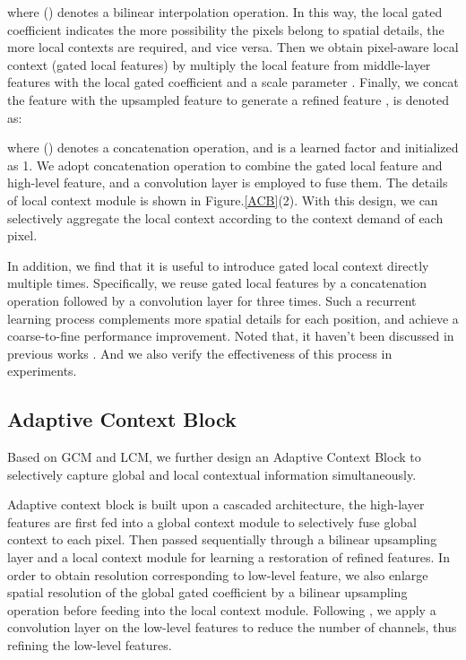 \documentclass[10pt,twocolumn,letterpaper]{article}
\begin{document}
where () denotes a bilinear interpolation operation.
In this way, the local gated coefficient indicates the more possibility the pixels belong to spatial details, the more local contexts are required, and vice versa. Then we obtain pixel-aware local context (gated local features) by multiply the local feature  from middle-layer features with  the local gated coefficient and a scale parameter . Finally, we concat the feature with the upsampled feature  to generate a refined feature ,  is denoted as:


where () denotes a concatenation operation, and  is a learned factor  and  initialized as 1. We adopt concatenation operation to combine the gated local feature and high-level feature, and  a convolution layer is employed to fuse them. The details of local context module is shown in Figure.\ref{ACB}(2).
With this design, we can selectively aggregate the local context according to the  context demand of each pixel.


In addition, we find that it is useful to introduce gated local context directly multiple times. Specifically, we reuse gated local features by  
a concatenation operation followed by  a convolution layer for three times.
Such a recurrent learning process complements more spatial details for each position, and achieve a coarse-to-fine performance improvement.  Noted that, it haven't been discussed in previous works \cite{refinenet, exfuse,yu2015multi,chen2018encoder}. And we also  verify the effectiveness of this process in experiments.



\subsection{Adaptive Context Block}
Based on GCM and LCM, we further design an Adaptive Context Block to  selectively  capture global and local contextual information simultaneously.

Adaptive context block is built upon a cascaded architecture, the  high-layer features are first fed into  a global context module to  selectively fuse global context to each pixel. 
Then  passed sequentially through a bilinear upsampling layer and   a local context module for learning a restoration of refined features. In order to obtain resolution corresponding to low-level feature, we also enlarge spatial resolution of the global gated coefficient by a bilinear upsampling operation before feeding into the local context module. Following \cite{chen2018encoder}, we apply a convolution layer on the low-level features to reduce the number of channels, thus refining the  low-level features. 
\end{document}
